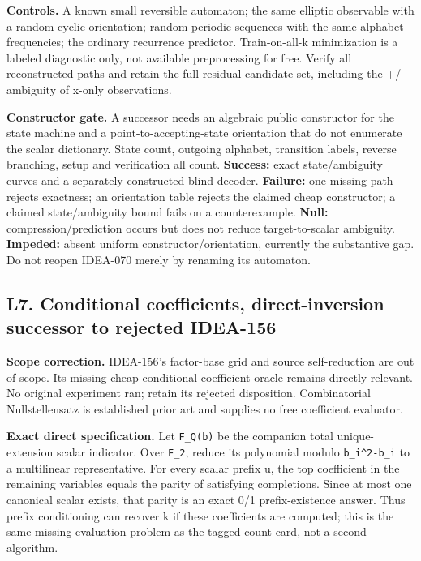\documentclass[
  10pt,
]{article}
\begin{document}
\textbf{Controls.} A known small reversible automaton; the same elliptic
observable with a random cyclic orientation; random periodic sequences
with the same alphabet frequencies; the ordinary recurrence predictor.
Train-on-all-k minimization is a labeled diagnostic only, not available
preprocessing for free. Verify all reconstructed paths and retain the
full residual candidate set, including the +/- ambiguity of x-only
observations.

\textbf{Constructor gate.} A successor needs an algebraic public
constructor for the state machine and a point-to-accepting-state
orientation that do not enumerate the scalar dictionary. State count,
outgoing alphabet, transition labels, reverse branching, setup and
verification all count. \textbf{Success:} exact state/ambiguity curves
and a separately constructed blind decoder. \textbf{Failure:} one
missing path rejects exactness; an orientation table rejects the claimed
cheap constructor; a claimed state/ambiguity bound fails on a
counterexample. \textbf{Null:} compression/prediction occurs but does
not reduce target-to-scalar ambiguity. \textbf{Impeded:} absent uniform
constructor/orientation, currently the substantive gap. Do not reopen
IDEA-070 merely by renaming its automaton.

\subsection{L7. Conditional coefficients, direct-inversion successor to
rejected
IDEA-156}\label{l7.-conditional-coefficients-direct-inversion-successor-to-rejected-idea-156}

\textbf{Scope correction.} IDEA-156's factor-base grid and source
self-reduction are out of scope. Its missing cheap
conditional-coefficient oracle remains directly relevant. No original
experiment ran; retain its rejected disposition. Combinatorial
Nullstellensatz is established prior art and supplies no free
coefficient evaluator.

\textbf{Exact direct specification.} Let \texttt{F\_Q(b)} be the
companion total unique-extension scalar indicator. Over \texttt{F\_2},
reduce its polynomial modulo \texttt{b\_i\^{}2-b\_i} to a multilinear
representative. For every scalar prefix u, the top coefficient in the
remaining variables equals the parity of satisfying completions. Since
at most one canonical scalar exists, that parity is an exact 0/1
prefix-existence answer. Thus prefix conditioning can recover k if these
coefficients are computed; this is the same missing evaluation problem
as the tagged-count card, not a second algorithm.
\end{document}
